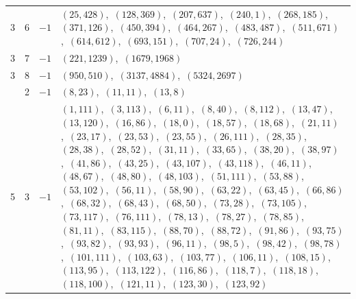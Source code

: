 \documentclass[11pt]{article}
\begin{document}
\begin{longtable}{@{}rrl>{\raggedright\arraybackslash}p{}@{}}
3 & 6 & $-1$ & $(25,428)$,\allowbreak\ $(128,369)$,\allowbreak\ $(207,637)$,\allowbreak\ $(240,1)$,\allowbreak\ $(268,185)$,\allowbreak\ $(371,126)$,\allowbreak\ $(450,394)$,\allowbreak\ $(464,267)$,\allowbreak\ $(483,487)$,\allowbreak\ $(511,671)$,\allowbreak\ $(614,612)$,\allowbreak\ $(693,151)$,\allowbreak\ $(707,24)$,\allowbreak\ $(726,244)$\\
3 & 7 & $-1$ & $(221,1239)$,\allowbreak\ $(1679,1968)$\\
3 & 8 & $-1$ & $(950,510)$,\allowbreak\ $(3137,4884)$,\allowbreak\ $(5324,2697)$\\
\addlinespace[3pt]
5 & 2 & $-1$ & $(8,23)$,\allowbreak\ $(11,11)$,\allowbreak\ $(13,8)$\\
5 & 3 & $-1$ & $(1,111)$,\allowbreak\ $(3,113)$,\allowbreak\ $(6,11)$,\allowbreak\ $(8,40)$,\allowbreak\ $(8,112)$,\allowbreak\ $(13,47)$,\allowbreak\ $(13,120)$,\allowbreak\ $(16,86)$,\allowbreak\ $(18,0)$,\allowbreak\ $(18,57)$,\allowbreak\ $(18,68)$,\allowbreak\ $(21,11)$,\allowbreak\ $(23,17)$,\allowbreak\ $(23,53)$,\allowbreak\ $(23,55)$,\allowbreak\ $(26,111)$,\allowbreak\ $(28,35)$,\allowbreak\ $(28,38)$,\allowbreak\ $(28,52)$,\allowbreak\ $(31,11)$,\allowbreak\ $(33,65)$,\allowbreak\ $(38,20)$,\allowbreak\ $(38,97)$,\allowbreak\ $(41,86)$,\allowbreak\ $(43,25)$,\allowbreak\ $(43,107)$,\allowbreak\ $(43,118)$,\allowbreak\ $(46,11)$,\allowbreak\ $(48,67)$,\allowbreak\ $(48,80)$,\allowbreak\ $(48,103)$,\allowbreak\ $(51,111)$,\allowbreak\ $(53,88)$,\allowbreak\ $(53,102)$,\allowbreak\ $(56,11)$,\allowbreak\ $(58,90)$,\allowbreak\ $(63,22)$,\allowbreak\ $(63,45)$,\allowbreak\ $(66,86)$,\allowbreak\ $(68,32)$,\allowbreak\ $(68,43)$,\allowbreak\ $(68,50)$,\allowbreak\ $(73,28)$,\allowbreak\ $(73,105)$,\allowbreak\ $(73,117)$,\allowbreak\ $(76,111)$,\allowbreak\ $(78,13)$,\allowbreak\ $(78,27)$,\allowbreak\ $(78,85)$,\allowbreak\ $(81,11)$,\allowbreak\ $(83,115)$,\allowbreak\ $(88,70)$,\allowbreak\ $(88,72)$,\allowbreak\ $(91,86)$,\allowbreak\ $(93,75)$,\allowbreak\ $(93,82)$,\allowbreak\ $(93,93)$,\allowbreak\ $(96,11)$,\allowbreak\ $(98,5)$,\allowbreak\ $(98,42)$,\allowbreak\ $(98,78)$,\allowbreak\ $(101,111)$,\allowbreak\ $(103,63)$,\allowbreak\ $(103,77)$,\allowbreak\ $(106,11)$,\allowbreak\ $(108,15)$,\allowbreak\ $(113,95)$,\allowbreak\ $(113,122)$,\allowbreak\ $(116,86)$,\allowbreak\ $(118,7)$,\allowbreak\ $(118,18)$,\allowbreak\ $(118,100)$,\allowbreak\ $(121,11)$,\allowbreak\ $(123,30)$,\allowbreak\ $(123,92)$\\

\end{longtable}
\end{document}
